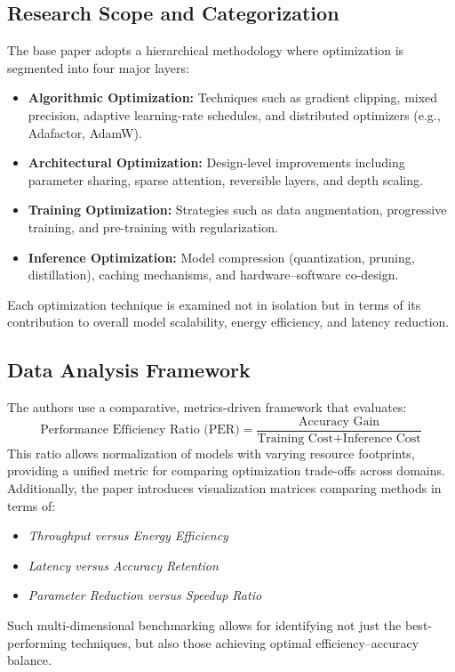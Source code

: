 \subsection{Research Scope and Categorization}
The base paper adopts a hierarchical methodology where optimization is segmented into four major layers:
\begin{itemize}
    \item \textbf{Algorithmic Optimization:} Techniques such as gradient clipping, mixed precision, adaptive learning-rate schedules, and distributed optimizers (e.g., Adafactor, AdamW).
    \item \textbf{Architectural Optimization:} Design-level improvements including parameter sharing, sparse attention, reversible layers, and depth scaling.
    \item \textbf{Training Optimization:} Strategies such as data augmentation, progressive training, and pre-training with regularization.
    \item \textbf{Inference Optimization:} Model compression (quantization, pruning, distillation), caching mechanisms, and hardware–software co-design.
\end{itemize}

Each optimization technique is examined not in isolation but in terms of its contribution to overall model scalability, energy efficiency, and latency reduction.

\subsection{Data Analysis Framework}
The authors use a comparative, metrics-driven framework that evaluates:
\[
\text{Performance Efficiency Ratio (PER)} = \frac{\text{Accuracy Gain}}{\text{Training Cost} + \text{Inference Cost}}
\]
This ratio allows normalization of models with varying resource footprints, providing a unified metric for comparing optimization trade-offs across domains.  
Additionally, the paper introduces visualization matrices comparing methods in terms of:
\begin{itemize}
    \item \textit{Throughput versus Energy Efficiency}
    \item \textit{Latency versus Accuracy Retention}
    \item \textit{Parameter Reduction versus Speedup Ratio}
\end{itemize}
Such multi-dimensional benchmarking allows for identifying not just the best-performing techniques, but also those achieving optimal efficiency–accuracy balance.

